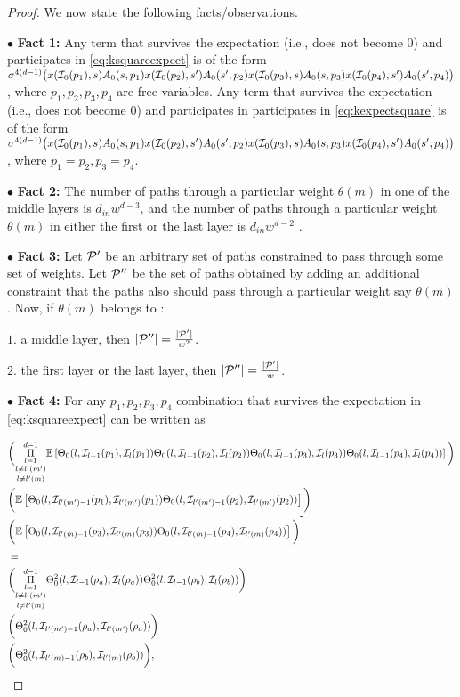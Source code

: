 \begin{proof}
We now state the following facts/observations.

$\bullet$ \textbf{Fact 1:} Any term that survives the expectation (i.e., does not become $0$) and participates in \eqref{eq:ksquareexpect} is of the form $\sigma^{4(d-1)}\big(x(\I_0(p_1),s)A_0(s,p_1)x(\I_0(p_2),s')A_0(s',p_2)x(\I_0(p_3),s)A_0(s,p_3)x(\I_0(p_4),s')A_0(s',p_4)\big)$, where $p_1,p_2,p_3,p_4$ are free variables. Any term that survives the expectation (i.e., does not become $0$) and participates in participates in \eqref{eq:kexpectsquare} is of the form $\sigma^{4(d-1)}\big(x(\I_0(p_1),s)A_0(s,p_1)x(\I_0(p_2),s')A_0(s',p_2)x(\I_0(p_3),s)A_0(s,p_3)x(\I_0(p_4),s')A_0(s',p_4)\big)$, where $p_1=p_2,p_3=p_4$.

$\bullet$ \textbf{Fact 2:} The number of paths through a particular weight $\theta(m)$ in one of the middle layers is $d_{in}w^{d-3}$, and the number of paths through a particular weight $\theta(m)$ in either the first or the last layer is $d_{in}w^{d-2}$ .

$\bullet$ \textbf{Fact 3:} Let $\P'$ be an arbitrary set of paths constrained to pass through some set of weights. Let $\P''$ be the set of paths obtained by adding an additional constraint that the paths also should pass through a particular weight say $\theta(m)$. Now, if $\theta(m)$ belongs to :

$1.$ a middle layer, then $|\P''|=\frac{|\P'|}{w^2}$.

$2.$ the first layer or the last layer, then $|\P''|=\frac{|\P'|}{w}$.

$\bullet$ \textbf{Fact 4:} For any $p_1,p_2,p_3,p_4$ combination that survives the expectation in \eqref{eq:ksquareexpect} can be written as 

\begin{align*}
&\bigg( \underset{l\neq l'(m)} {\underset{l\neq l'(m')}{\underset{l=1}{\overset{d-1}{\Pi}}}} \E{\Tb_0(l,\I_{l-1}(p_1),\I_{l}(p_1)) \Tb_0(l,\I_{l-1}(p_2),\I_{l}(p_2))\Tb_0(l,\I_{l-1}(p_3),\I_{l}(p_3)) \Tb_0(l,\I_{l-1}(p_4),\I_{l}(p_4))} \bigg)\nn\\
&\bigg( \E{\Tb_0(l,\I_{l'(m')-1}(p_1),\I_{l'(m')}(p_1)) \Tb_0(l,\I_{l'(m')-1}(p_2),\I_{l'(m')}(p_2))}\bigg)\nn\\
&\bigg(\E{\Tb_0(l,\I_{l'(m)-1}(p_3),\I_{l'(m)}(p_3)) \Tb_0(l,\I_{l'(m)-1}(p_4),\I_{l'(m)}(p_4))} \bigg)\Bigg]\nn\\
&=\\
&\bigg( \underset{l\neq l'(m)} {\underset{l\neq l'(m')}{\underset{l=1}{\overset{d-1}{\Pi}}}} \Tb^2_0(l,\I_{l-1}(\rho_a),\I_{l}(\rho_a)) \Tb^2_0(l,\I_{l-1}(\rho_b),\I_{l}(\rho_b)) \bigg)\nn\\
&\bigg( \Tb^2_0(l,\I_{l'(m')-1}(\rho_a),\I_{l'(m')}(\rho_a))\bigg)\nn\\
&\bigg({\Tb^2_0(l,\I_{l'(m)-1}(\rho_b),\I_{l'(m)}(\rho_b))} \bigg),
\end{align*}


\end{proof}
